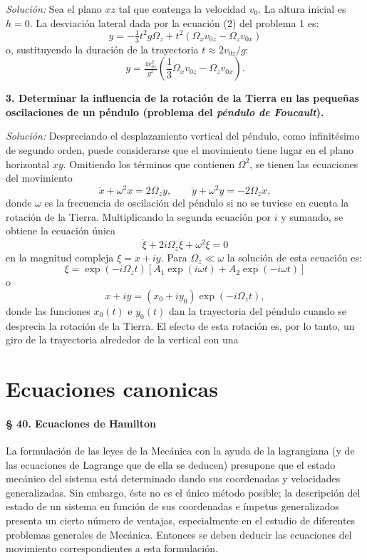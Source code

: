 \documentclass[12pt]{article}
\begin{document}
\textit{Solución:} Sea el plano $xz$ tal que contenga la velocidad $v_0$. La altura inicial es $h = 0$. La desviación lateral dada por la ecuación (2) del problema 1 es:
\[
y = -\tfrac{1}{3} t^2 g \Omega_z + t^2 ( \Omega_x v_{0z} - \Omega_z v_{0x} )
\]
o, sustituyendo la duración de la trayectoria $t \approx 2v_{0z}/g$:
\[
y = \tfrac{4v_{0z}^2}{g^2} (\frac{1}{3} \Omega_x v_{0z} - \Omega_z v_{0x} ).
\]

\vspace{1em}

\textbf{3. Determinar la influencia de la rotación de la Tierra en las pequeñas oscilaciones de un péndulo (problema del \textit{péndulo de Foucault}).}

\textit{Solución:} Despreciando el desplazamiento vertical del péndulo, como infinitésimo de segundo orden, puede considerarse que el movimiento tiene lugar en el plano horizontal $xy$. Omitiendo los términos que contienen $\Omega^2$, se tienen las ecuaciones del movimiento
\[
\ddot{x} + \omega^2 x = 2\Omega_z \dot{y}, \qquad \ddot{y} + \omega^2 y = -2\Omega_z \dot{x},
\]
donde $\omega$ es la frecuencia de oscilación del péndulo si no se tuviese en cuenta la rotación de la Tierra. Multiplicando la segunda ecuación por $i$ y sumando, se obtiene la ecuación única
\[
\ddot{\xi} + 2i\Omega_z \dot{\xi} + \omega^2 \xi = 0
\]
en la magnitud compleja $\xi = x + i y$. Para $\Omega_z \ll \omega$ la solución de esta ecuación es:
\[
\xi = \exp(-i\Omega_z t) [A_1 \exp(i\omega t) + A_2 \exp(-i\omega t)]
\]
o
\[
x + i y = (x_0 + i y_0) \exp(-i\Omega_z t),
\]
donde las funciones $x_0(t)$ e $y_0(t)$ dan la trayectoria del péndulo cuando se desprecia la rotación de la Tierra. El efecto de esta rotación es, por lo tanto, un giro de la trayectoria alrededor de la vertical con una

\section{Ecuaciones canonicas}

\paragraph*{§ 40. Ecuaciones de Hamilton}

La formulación de las leyes de la Mecánica con la ayuda de la lagrangiana (y de las ecuaciones de Lagrange que de ella se deducen) presupone que el estado mecánico del sistema está determinado dando sus coordenadas y velocidades generalizadas. Sin embargo, éste no es el único método posible; la descripción del estado de un sistema en función de sus coordenadas e ímpetus generalizados presenta un cierto número de ventajas, especialmente en el estudio de diferentes problemas generales de Mecánica. Entonces se deben deducir las ecuaciones del movimiento correspondientes a esta formulación.
\end{document}
